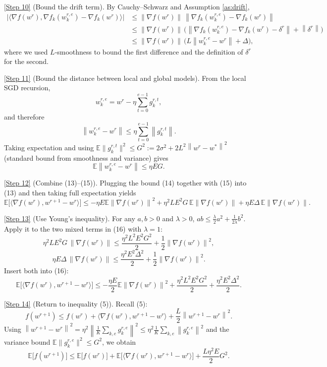 \documentclass{article}
\newcommand{\E}{\mathbb{E}}
\newcommand{\norm}[1]{\left\lVert#1\right\rVert}
\newcommand{\inner}[2]{\langle #1,#2\rangle}
\newcommand{\grad}{\nabla}
\begin{document}
\noindent\underline{[Step 10]} (Bound the drift term).  
By Cauchy–Schwarz and Assumption \ref{as:drift},
\[
\begin{aligned}
\Big|\inner{\grad f(w^{r})}{\grad f_k(w_{k}^{r,e})-\grad f_k(w^{r})}\Big|
&\le \norm{\grad f(w^{r})}\,
      \norm{\grad f_k(w_{k}^{r,e})-\grad f_k(w^{r})}\\
&\le \norm{\grad f(w^{r})}\,
      \big(\norm{\grad f_k(w_{k}^{r,e})-\grad f_k(w^{r})-\delta^{r}}
          +\norm{\delta^{r}}\big)\\
&\le \norm{\grad f(w^{r})}\,
      \big(L\norm{w_{k}^{r,e}-w^{r}}+\Delta\big),
\end{aligned}
\tag{14}
\]
where we used $L$‑smoothness to bound the first difference and the
definition of $\delta^{r}$ for the second.

\noindent\underline{[Step 11]} (Bound the distance between local and global
models).  
From the local SGD recursion,
\[
w_{k}^{r,e}=w^{r}-\eta\sum_{t=0}^{e-1} g_{k}^{r,t},
\]
and therefore
\[
\norm{w_{k}^{r,e}-w^{r}}\le \eta\sum_{t=0}^{e-1}\norm{g_{k}^{r,t}}.
\]
Taking expectation and using $\E\|g_{k}^{r,t}\|^{2}\le G^{2}:=2\sigma^{2}+2L^{2}
\norm{w^{r}-w^{*}}^{2}$ (standard bound from smoothness and variance) gives
\[
\E\!\norm{w_{k}^{r,e}-w^{r}}\le \eta E G. \tag{15}
\]

\noindent\underline{[Step 12]} (Combine (13)–(15)).  
Plugging the bound (14) together with (15) into (13) and then taking
full expectation yields
\[
\E\!\big[\inner{\grad f(w^{r})}{w^{r+1}-w^{r}}\big]
\le -\eta E\E\!\norm{\grad f(w^{r})}^{2}
+ \eta^{2} L E^{2} G \,\E\!\norm{\grad f(w^{r})}
+ \eta E\Delta\,\E\!\norm{\grad f(w^{r})}. \tag{16}
\]

\noindent\underline{[Step 13]} (Use Young’s inequality).  
For any $a,b>0$ and $\lambda>0$, $ab\le \frac{\lambda}{2}a^{2}+\frac{1}{2\lambda}b^{2}$.
Apply it to the two mixed terms in (16) with $\lambda=1$:
\[
\eta^{2} L E^{2} G \,\norm{\grad f(w^{r})}
\le \frac{\eta^{2}L^{2}E^{2}G^{2}}{2}
    +\frac12\norm{\grad f(w^{r})}^{2},
\]
\[
\eta E\Delta\,\norm{\grad f(w^{r})}
\le \frac{\eta^{2}E^{2}\Delta^{2}}{2}
    +\frac12\norm{\grad f(w^{r})}^{2}.
\]
Insert both into (16):
\[
\E\!\big[\inner{\grad f(w^{r})}{w^{r+1}-w^{r}}\big]
\le -\frac{\eta E}{2}\E\!\norm{\grad f(w^{r})}^{2}
+ \frac{\eta^{2}L^{2}E^{2}G^{2}}{2}
+ \frac{\eta^{2}E^{2}\Delta^{2}}{2}. \tag{17}
\]

\noindent\underline{[Step 14]} (Return to inequality (5)).  
Recall (5):
\[
f(w^{r+1})\le f(w^{r})
+\inner{\grad f(w^{r})}{w^{r+1}-w^{r}}
+\frac{L}{2}\norm{w^{r+1}-w^{r}}^{2}.
\]
Using $\norm{w^{r+1}-w^{r}}^{2}
= \eta^{2}\norm{\tfrac1K\sum_{k,e} g_{k}^{r,e}}^{2}
\le \eta^{2}\frac1K\sum_{k,e}\norm{g_{k}^{r,e}}^{2}$
and the variance bound $\E\|g_{k}^{r,e}\|^{2}\le G^{2}$, we obtain
\[
\E\!\big[f(w^{r+1})\big]\le
\E\!\big[f(w^{r})\big]
+\E\!\big[\inner{\grad f(w^{r})}{w^{r+1}-w^{r}}\big]
+\frac{L\eta^{2}E}{2}G^{2}. \tag{18}
\]
\end{document}
